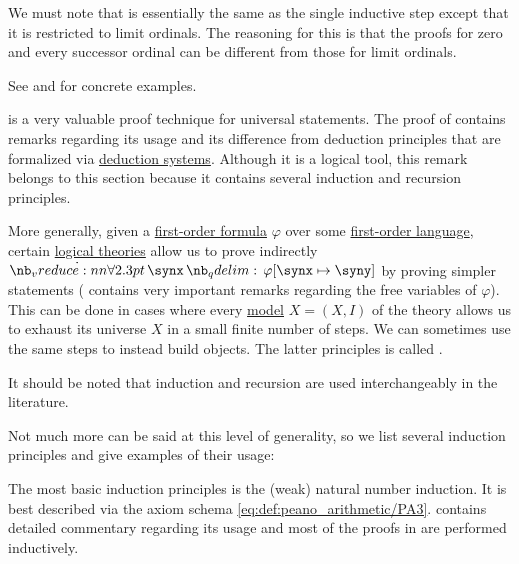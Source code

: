\begin{remark}
  We must note that  is essentially the same as the single inductive step  except that it is restricted to limit ordinals. The reasoning for this is that the proofs for zero and every successor ordinal can be different from those for limit ordinals.

  See  and  for concrete examples.
\end{remark}

\begin{concept}\label{con:induction}
   is a very valuable proof technique for universal statements. The proof of  contains remarks regarding its usage and its difference from deduction principles that are formalized via \hyperref[def:deduction_system]{deduction systems}. Although it is a logical tool, this remark belongs to this section because it contains several induction and recursion principles.

  More generally, given a \hyperref[def:first_order_syntax/formula]{first-order formula} \( \varphi \) over some \hyperref[def:first_order_language]{first-order language}, certain \hyperref[def:first_order_theory]{logical theories} allow us to prove indirectly \( \qforall \synx \varphi[\synx \mapsto \syny] \) by proving simpler statements ( contains very important remarks regarding the free variables of \( \varphi \)). This can be done in cases where every \hyperref[def:first_order_model]{model} \( X = (X, I) \) of the theory allows us to exhaust its universe \( X \) in a small finite number of steps. We can sometimes use the same steps to instead build objects. The latter principles is called .

  It should be noted that induction and recursion are used interchangeably in the literature.

  Not much more can be said at this level of generality, so we list several induction principles and give examples of their usage:
  \begin{thmenum}
     The most basic induction principles is the (weak) natural number induction. It is best described via the axiom schema \eqref{eq:def:peano_arithmetic/PA3}.  contains detailed commentary regarding its usage and most of the proofs in  are performed inductively.


\end{thmenum}
\end{concept}
